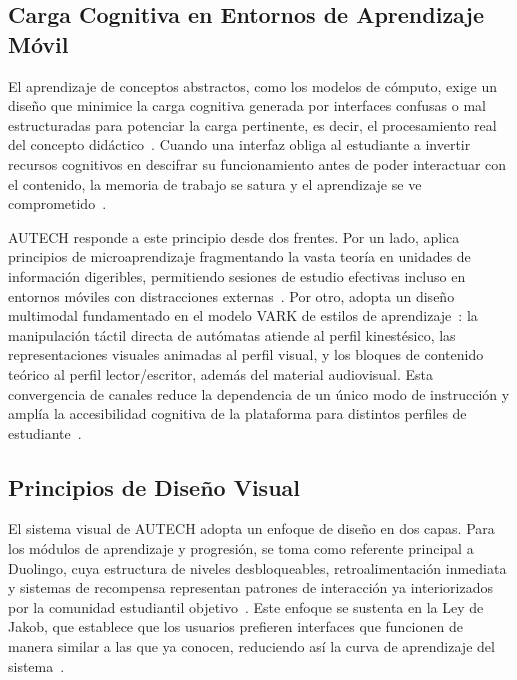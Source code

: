 \subsection{Carga Cognitiva en Entornos de Aprendizaje Móvil}
\label{ssec:carga_cognitiva}

El aprendizaje de conceptos abstractos, como los modelos de cómputo, exige un diseño que
minimice la carga cognitiva generada por interfaces confusas o mal estructuradas para potenciar
la carga pertinente, es decir, el procesamiento real del concepto
didáctico~\cite{sweller1988}. Cuando una interfaz obliga al estudiante a invertir recursos
cognitivos en descifrar su funcionamiento antes de poder interactuar con el contenido, la
memoria de trabajo se satura y el aprendizaje se ve comprometido~\cite{sweller1988}.

AUTECH responde a este principio desde dos frentes. Por un lado, aplica principios de
microaprendizaje fragmentando la vasta teoría en unidades de información digeribles,
permitiendo sesiones de estudio efectivas incluso en entornos móviles con distracciones
externas~\cite{crompton2018}. Por otro, adopta un diseño multimodal fundamentado en el modelo
VARK de estilos de aprendizaje~\cite{fleming1992}: la manipulación táctil directa de autómatas
atiende al perfil kinestésico, las representaciones visuales animadas al perfil visual, y los
bloques de contenido teórico al perfil lector/escritor, además del material audiovisual. Esta
convergencia de canales reduce la dependencia de un único modo de instrucción y amplía la
accesibilidad cognitiva de la plataforma para distintos perfiles de
estudiante~\cite{felder2016, sweller1988}.

\subsection{Principios de Diseño Visual}
\label{ssec:disenio_visual}

El sistema visual de AUTECH adopta un enfoque de diseño en dos capas. Para los módulos de
aprendizaje y progresión, se toma como referente principal a Duolingo, cuya estructura de
niveles desbloqueables, retroalimentación inmediata y sistemas de recompensa representan
patrones de interacción ya interiorizados por la comunidad estudiantil
objetivo~\cite{duolingo2024}. Este enfoque se sustenta en la Ley de Jakob, que establece que
los usuarios prefieren interfaces que funcionen de manera similar a las que ya conocen,
reduciendo así la curva de aprendizaje del sistema~\cite{nielsen1994}.


